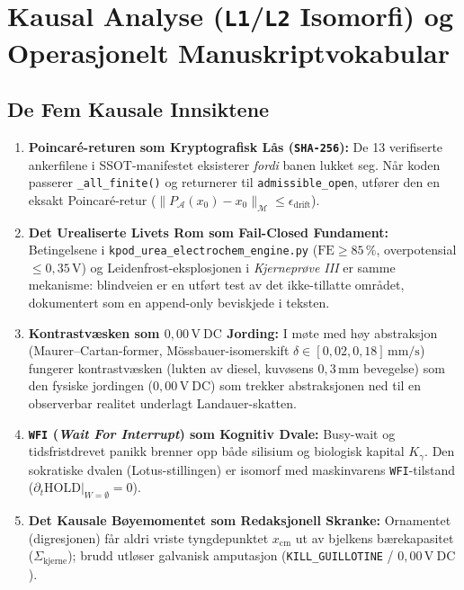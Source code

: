 \documentclass[11pt,a4paper,oneside]{book}
\theoremstyle{definition}
\begin{document}
\chapter{Kausal Analyse (\texttt{L1}/\texttt{L2} Isomorfi) og Operasjonelt Manuskriptvokabular}

\section{De Fem Kausale Innsiktene}
\begin{enumerate}
    \item \textbf{Poincaré-returen som Kryptografisk Lås (\texttt{SHA-256}):} De 13 verifiserte ankerfilene i SSOT-manifestet eksisterer \emph{fordi} banen lukket seg. Når koden passerer \texttt{\_all\_finite()} og returnerer til \texttt{admissible\_open}, utfører den en eksakt Poincaré-retur ($\lVert P_{\mathcal{A}}(x_0) - x_0\rVert_{\mathcal{M}} \le \epsilon_{\mathrm{drift}}$).
    \item \textbf{Det Urealiserte Livets Rom som Fail-Closed Fundament:} Betingelsene i \texttt{kpod\_urea\_electrochem\_engine.py} ($\mathrm{FE} \ge 85\,\%$, overpotensial $\le 0{,}35\,\mathrm{V}$) og Leidenfrost-eksplosjonen i \emph{Kjerneprøve III} er samme mekanisme: blindveien er en utført test av det ikke-tillatte området, dokumentert som en append-only beviskjede i teksten.
    \item \textbf{Kontrastvæsken som $0{,}00\,\mathrm{V\ DC}$ Jording:} I møte med høy abstraksjon (Maurer--Cartan-former, Mössbauer-isomerskift $\delta \in [0{,}02, 0{,}18]\,\mathrm{mm/s}$) fungerer kontrastvæsken (lukten av diesel, kuvøsens $0{,}3\,\mathrm{mm}$ bevegelse) som den fysiske jordingen ($0{,}00\,\mathrm{V\ DC}$) som trekker abstraksjonen ned til en observerbar realitet underlagt Landauer-skatten.
    \item \textbf{\texttt{WFI} (\emph{Wait For Interrupt}) som Kognitiv Dvale:} Busy-wait og tidsfristdrevet panikk brenner opp både silisium og biologisk kapital $K_\gamma$. Den sokratiske dvalen (Lotus-stillingen) er isomorf med maskinvarens \texttt{WFI}-tilstand ($\left.\partial_t \mathrm{HOLD}\right|_{W=\emptyset} = 0$).
    \item \textbf{Det Kausale Bøyemomentet som Redaksjonell Skranke:} Ornamentet (digresjonen) får aldri vriste tyngdepunktet $x_{\mathrm{cm}}$ ut av bjelkens bærekapasitet ($\Sigma_{\mathrm{kjerne}}$); brudd utløser galvanisk amputasjon (\texttt{KILL\_GUILLOTINE} / $0{,}00\,\mathrm{V\ DC}$).
\end{enumerate}
\end{document}
